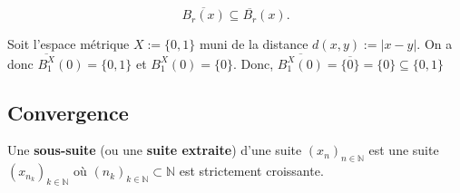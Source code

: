 \begin{theo}
    \begin{equation*}
        \overline{B_r(x)} \subseteq \overline{B_r}(x).
    \end{equation*}
\end{theo}

\begin{example}
    Soit l'espace métrique $X := \{0,1\}$ muni de la distance $d(x,y) := |x-y|$. On a donc $\overline{B_1^X}(0) = \{0,1\}$ et $B_1^X(0) = \{0\}$. Donc, $\overline{B_1^X(0)} = \overline{\{0\}} = \{0\} \subseteq \{0,1\}$
\end{example}




\subsection{Convergence}

\begin{definition}
    Une \textbf{sous-suite} (ou une \textbf{suite extraite}) d'une suite $(x_n)_{n\in\mathbb{N}}$ est une suite $(x_{n_k})_{k\in\mathbb{N}}$ où $(n_k)_{k\in\mathbb{N}}\subset \mathbb{N}$ est strictement croissante.
\end{definition}

